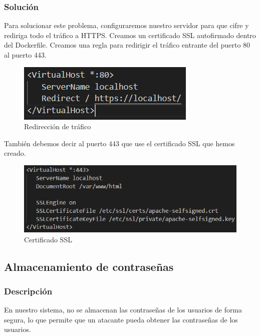 \documentclass{report}
\begin{document}
                \subsubsection{Solución}
                    Para solucionar este problema, configuraremos nuestro servidor para que cifre y rediriga todo el tráfico a HTTPS.
                    Creamos un certificado SSL autofirmado dentro del Dockerfile.
                    Creamos una regla para redirigir el tráfico entrante del puerto 80 al puerto 443.
                    \begin{figure}[H]
                        \centering
                        \includegraphics[width=\textwidth]{./img/vulnerabilidades/3.2/1.1.png}
                        \caption{Redirección de tráfico}
                    \end{figure}
                    
                    También debemos decir al puerto 443 que use el certificado SSL que hemos creado.
                    \begin{figure}[H]
                        \centering
                        \includegraphics[width=\textwidth]{./img/vulnerabilidades/3.2/1.2.png}
                        \caption{Certificado SSL}
                    \end{figure}
            \clearpage
            \subsection{Almacenamiento de contraseñas}
                \subsubsection{Descripción}
                    En nuestro sistema, no se almacenan las contraseñas de los usuarios de forma segura, lo que permite que un atacante pueda obtener las contraseñas de los usuarios.
\end{document}
